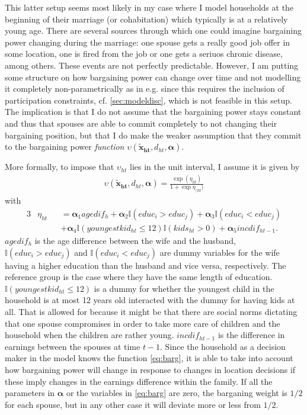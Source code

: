 This latter setup seems most likely in my case where I model households at the beginning of their marriage (or cohabitation) which typically is at a relatively young age. There are several sources through which one could imagine bargaining power changing during the marriage: one spouse gets a really good job offer in some location, one is fired from the job or one gets a seriuos chronic disease, among others. These events are not perfectly predictable. However, I am putting some structure on how bargaining power can change over time and not modelling it completely non-parametrically as in e.g. \cite{Voena2015} since this requires the inclusion of participation constraints, cf. \autoref{sec:modeldisc}, which is not feasible in this setup. The implication is that I do not assume that the bargaining power stays constant and thus that spouses are able to commit completely to not changing their bargaining position, but that I do make the weaker assumption that they commit to the bargaining power \textit{function} $\upsilon(\boldsymbol{\tilde{x}_{ht}},d_{ht},\boldsymbol{\alpha})$. 

More formally, to impose that $\upsilon_{ht}$ lies in the unit interval, I assume it is given by 
\begin{align}
\upsilon(\boldsymbol{\tilde{x}_{ht}},d_{ht},\boldsymbol{\alpha})= \frac{\exp{(\eta_{ht})}}{1+\exp{\eta_{(ht})}}
\label{eq:barg}
\end{align}
with
\begin{alignat*}{3}
&\eta_{ht}&&=\boldsymbol{\alpha}_1 agedif_h + \boldsymbol{\alpha}_2\mathbb{I}{(educ_i > educ_j)}+\boldsymbol{\alpha}_3\mathbb{I}{(educ_i < educ_j)} \\
& &&+ \boldsymbol{\alpha}_4 \mathbb{I}{(youngestkid_{ht}\leq 12)}\mathbb{I}{(kids_{ht}>0)} + \boldsymbol{\alpha}_5 incdif_{ht-1}.
\end{alignat*}
$agedif_h$ is the age difference between the wife and the husband, $\mathbb{I}{(educ_i > educ_j)}$ and $ \mathbb{I}{(educ_i < educ_j)}$
are dummy variables for the wife having a higher education than the husband and vice versa, respectively. The reference group is the case where they have the same length of education. $\mathbb{I}{(youngestkid_{ht} \leq 12)}$ is a dummy for whether the youngest child in the household is at most 12 years old interacted with the dummy for having kids at all. That is allowed for because it might be that there are social norms dictating that one spouse compromises in order to take more care of children and the household when the children are rather young. $incdif_{ht-1}$ is the difference in earnings between the spouses at time $t-1$. Since the household as a decision maker in the model knows the function \eqref{eq:barg}, it is able to take into account how bargaining power will change in response to changes in location decisions if these imply changes in the earnings difference within the family. 
If all the parameters in $\boldsymbol{\alpha}$ or the variables in \eqref{eq:barg} are zero, the barganing weight is $1/2$ for each spouse, but in any other case it will deviate more or less from $1/2$.

